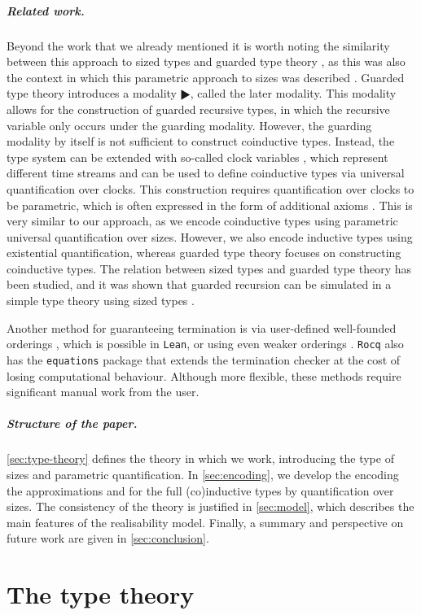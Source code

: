 \documentclass[10pt,a4paper]{article}
\theoremstyle{definition}
\theoremstyle{remark}
\renewcommand{\.}{.\,} %
\renewcommand{\:}{:} %
\newcommand{\0}{\mathbf{0}}
\newcommand{\1}{\mathbf{1}}
\newcommand\<\langle
\renewcommand\>\rangle
\theoremstyle{remark}
\begin{document}
\subparagraph*{Related work.}
Beyond the work that we already mentioned it is worth noting the similarity between this approach to sized types and guarded type theory \cite{nakano}, as this was also the context in which this parametric approach to sizes was described \cite{licentiate}.
Guarded type theory introduces a modality $\RHD$, called the later modality.
This modality allows for the construction of guarded recursive types, in which the recursive variable only occurs under the guarding modality.
However, the guarding modality by itself is not sufficient to construct coinductive types.
Instead, the type system can be extended with so-called clock variables \cite{prod-coprogramming}, which represent different time streams and can be used to define coinductive types via universal quantification over clocks.
This construction requires quantification over clocks to be parametric, which is often expressed in the form of additional axioms \cite{mogelberg,guardedtypes16}.
This is very similar to our approach, as we encode coinductive types using parametric universal quantification over sizes. 
However, we also encode inductive types using existential quantification, whereas guarded type theory focuses on constructing coinductive types.
The relation between sized types and guarded type theory has been studied, and it was shown that guarded recursion can be simulated in a simple type theory using sized types \cite{guarded-via-sized}.

Another method for guaranteeing termination is via user-defined well-founded orderings \cite{Leroy2024}, which is possible in \texttt{Lean}, or using even weaker orderings \cite{qwf-order}.
\texttt{Rocq} also has the \texttt{equations} package \cite{hutchison_equations_2010,mangin2015equations,sozeau2019equations} that extends the termination checker at the cost of losing computational behaviour.
Although more flexible, these methods require significant manual work from the user.

\subparagraph*{Structure of the paper.}
\autoref{sec:type-theory} defines the theory in which we work, introducing the type of sizes and parametric quantification. In \autoref{sec:encoding}, we develop the encoding the approximations and for the full (co)inductive types by quantification over sizes. The consistency of the theory is justified in \autoref{sec:model}, which describes the main features of the realisability model. Finally, a summary and perspective on future work are given in \autoref{sec:conclusion}.
    
    \section{The type theory} 
    \label{sec:type-theory}
    
\end{document}

